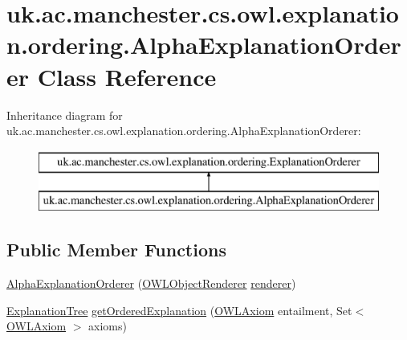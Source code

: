 \hypertarget{classuk_1_1ac_1_1manchester_1_1cs_1_1owl_1_1explanation_1_1ordering_1_1_alpha_explanation_orderer}{\section{uk.\-ac.\-manchester.\-cs.\-owl.\-explanation.\-ordering.\-Alpha\-Explanation\-Orderer Class Reference}
\label{classuk_1_1ac_1_1manchester_1_1cs_1_1owl_1_1explanation_1_1ordering_1_1_alpha_explanation_orderer}
}
Inheritance diagram for uk.\-ac.\-manchester.\-cs.\-owl.\-explanation.\-ordering.\-Alpha\-Explanation\-Orderer\-:\begin{figure}[H]
\begin{center}
\leavevmode
\includegraphics[height=2.000000cm]{classuk_1_1ac_1_1manchester_1_1cs_1_1owl_1_1explanation_1_1ordering_1_1_alpha_explanation_orderer}
\end{center}
\end{figure}
\subsection*{Public Member Functions}
\begin{DoxyCompactItemize}
\item 
\hyperlink{classuk_1_1ac_1_1manchester_1_1cs_1_1owl_1_1explanation_1_1ordering_1_1_alpha_explanation_orderer_a9f87e4f9b09c4c52280e727e6fb35c25}{Alpha\-Explanation\-Orderer} (\hyperlink{interfaceorg_1_1semanticweb_1_1owlapi_1_1io_1_1_o_w_l_object_renderer}{O\-W\-L\-Object\-Renderer} \hyperlink{classuk_1_1ac_1_1manchester_1_1cs_1_1owl_1_1explanation_1_1ordering_1_1_alpha_explanation_orderer_ae5937bfb24d2252923a0594b886a3a4f}{renderer})
\item 
\hyperlink{classuk_1_1ac_1_1manchester_1_1cs_1_1owl_1_1explanation_1_1ordering_1_1_explanation_tree}{Explanation\-Tree} \hyperlink{classuk_1_1ac_1_1manchester_1_1cs_1_1owl_1_1explanation_1_1ordering_1_1_alpha_explanation_orderer_aee164af7587ab5ef0461f9df560e88d9}{get\-Ordered\-Explanation} (\hyperlink{interfaceorg_1_1semanticweb_1_1owlapi_1_1model_1_1_o_w_l_axiom}{O\-W\-L\-Axiom} entailment, Set$<$ \hyperlink{interfaceorg_1_1semanticweb_1_1owlapi_1_1model_1_1_o_w_l_axiom}{O\-W\-L\-Axiom} $>$ axioms)
\end{DoxyCompactItemize}
